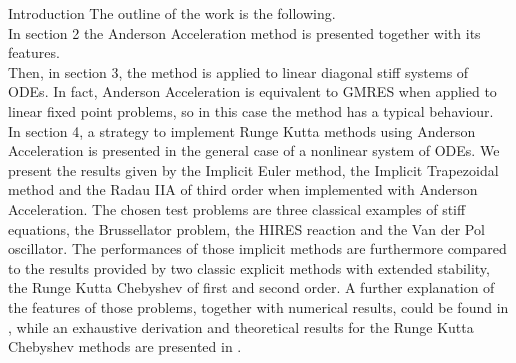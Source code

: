 \documentclass{article}
\begin{document}
\begin{section}{Introduction}
The outline of the work is the following. \\
In section 2 the Anderson Acceleration method is presented together with its features.\\
Then, in section 3, the method is applied to linear diagonal stiff systems of ODEs. In fact, Anderson Acceleration is equivalent to GMRES \cite{WALNI} when applied to linear fixed point problems, so in this case the method has a typical behaviour. \\
In section 4, a strategy to implement Runge Kutta methods using Anderson Acceleration is presented in the general case of a nonlinear system of ODEs. We present the results given by the Implicit Euler method, the Implicit Trapezoidal method and the Radau IIA of third order when implemented with Anderson Acceleration. The chosen test problems are three classical examples of stiff equations, the Brussellator problem, the HIRES reaction and the Van der Pol oscillator. The performances of those implicit methods are furthermore compared to the results provided by two classic explicit methods with extended stability, the Runge Kutta Chebyshev of first and second order. A further explanation of the features of those problems, together with numerical results, could be found in \cite{HW,JC,HAIR}, while an exhaustive derivation and theoretical results for the Runge Kutta Chebyshev methods are presented in \cite{HW}.
\end{section}
\end{document}
